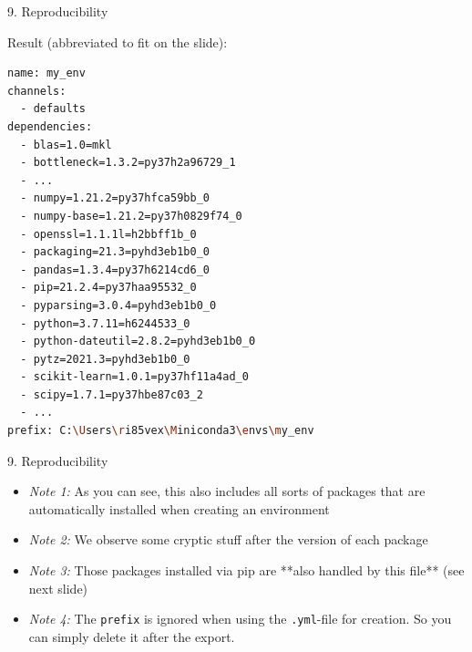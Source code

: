 
\begin{vbframe}{9. Reproducibility}

\vfill

Result (abbreviated to fit on the slide):

\scriptsize

\begin{lstlisting}[language=bash,basicstyle=\tiny\ttfamily]
name: my_env
channels:
  - defaults
dependencies:
  - blas=1.0=mkl
  - bottleneck=1.3.2=py37h2a96729_1
  - ...
  - numpy=1.21.2=py37hfca59bb_0
  - numpy-base=1.21.2=py37h0829f74_0
  - openssl=1.1.1l=h2bbff1b_0
  - packaging=21.3=pyhd3eb1b0_0
  - pandas=1.3.4=py37h6214cd6_0
  - pip=21.2.4=py37haa95532_0
  - pyparsing=3.0.4=pyhd3eb1b0_0
  - python=3.7.11=h6244533_0
  - python-dateutil=2.8.2=pyhd3eb1b0_0
  - pytz=2021.3=pyhd3eb1b0_0
  - scikit-learn=1.0.1=py37hf11a4ad_0
  - scipy=1.7.1=py37hbe87c03_2
  - ...
prefix: C:\Users\ri85vex\Miniconda3\envs\my_env
\end{lstlisting}

\vfill

\end{vbframe}


\begin{vbframe}{9. Reproducibility}

\vfill

\begin{itemize}
	\item \textit{Note 1:} As you can see, this also includes all sorts of packages that are automatically
  installed when creating an environment
	\item \textit{Note 2:} We observe some cryptic stuff after the version of each package 
  \item \textit{Note 3:} Those packages installed via pip are **also handled by this file** (see next slide)
  \item \textit{Note 4:} The \texttt{prefix} is ignored when using the \texttt{.yml}-file for creation.
  So you can simply delete it after the export.
\end{itemize}

\vfill

\end{vbframe}


